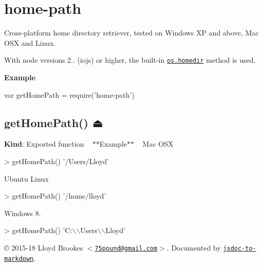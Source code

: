 \href{https://www.npmjs.org/package/home-path}{\tt } \href{https://www.npmjs.org/package/home-path}{\tt } \href{https://travis-ci.org/75lb/home-path}{\tt } \href{https://david-dm.org/75lb/home-path}{\tt } \href{https://github.com/feross/standard}{\tt }

\label{_module_home-path}%


\section*{home-\/path}

Cross-\/platform home directory retriever, tested on Windows XP and above, Mac O\+SX and Linux.

With node versions 2.. (iojs) or higher, the built-\/in \href{https://nodejs.org/api/os.html#os_os_homedir}{\tt {\ttfamily os.\+homedir}} method is used.

{\bfseries Example} 
\begin{DoxyCode}
var getHomePath = require('home-path')
\end{DoxyCode}
 \label{_exp_module_home-path--getHomePath}%


\subsection*{get\+Home\+Path() ⏏}

{\bfseries Kind}\+: Exported function ~\newline
$\ast$$\ast$\+Example$\ast$$\ast$ ~\newline
Mac O\+SX 
\begin{DoxyCode}
> getHomePath()
'/Users/Lloyd'
\end{DoxyCode}


Ubuntu Linux 
\begin{DoxyCode}
> getHomePath()
'/home/lloyd'
\end{DoxyCode}


Windows 8. 
\begin{DoxyCode}
> getHomePath()
'C:\(\backslash\)\(\backslash\)Users\(\backslash\)\(\backslash\)Lloyd'
\end{DoxyCode}






\copyright{} 2015-\/18 Lloyd Brookes $<$\href{mailto:75pound@gmail.com}{\tt 75pound@gmail.\+com}$>$. Documented by \href{https://github.com/jsdoc2md/jsdoc-to-markdown}{\tt jsdoc-\/to-\/markdown}. 